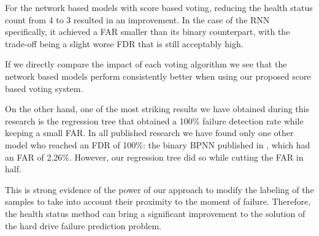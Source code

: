 For the network based models with score based voting, reducing the health status count from 4 to 3 resulted in an improvement.
In the case of the RNN specifically, it achieved a FAR smaller than its binary counterpart, with the trade-off being a slight worse FDR that is still acceptably high.

If we directly compare the impact of each voting algorithm we see that the network based models perform consistently better when using our proposed score based voting system.

On the other hand, one of the most striking results we have obtained during this research is the regression tree that obtained a 100\% failure detection rate while keeping a small FAR.
In all published research we have found only one other model who reached an FDR of 100\%: the binary BPNN published in \cite{Zhu13}, which had an FAR of 2.26\%.
However, our regression tree did so while cutting the FAR in half.

This is strong evidence of the power of our approach to modify the labeling of the samples to take into account their proximity to the moment of failure.
Therefore, the health status method can bring a significant improvement to the solution of the hard drive failure prediction problem.